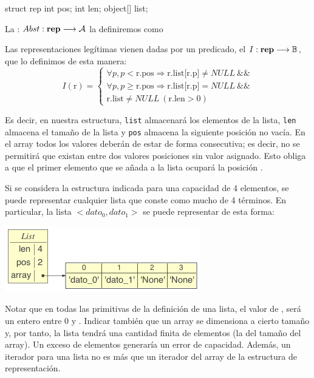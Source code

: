 \hfil \begin{minipage}{.25\textwidth}
\begin{pyverbatim}[][frame=single]
struct rep {
   int pos;
   int len;
   object[] list;
}
\end{pyverbatim}
\end{minipage}


La :
$
Abst: \mbox{\textbf{rep}} \longrightarrow {\cal A}
$
la definiremos como

\centerline{}

Las representaciones legítimas vienen dadas por un predicado, el  
$I: \mbox{\textbf{rep}} \longrightarrow \mathbb{B}$, que lo definimos de esta manera:
$$I( \text{r} ) =
\left\{
\begin{array}{l}
\forall p, p < \text{r.pos} \Rightarrow \text{r.list[r.p]} \not= NULL\ \&\& \\
\forall p, p \geq \text{r.pos} \Rightarrow \text{r.list[r.p]} = NULL \ \&\& \\
\text{r.list} \not= NULL \ (\text{r.len} > 0)
\end{array}
\right.
$$

Es decir, en nuestra estructura, \texttt{list} almacenará los elementos de la lista, \texttt{len} almacena el tamaño de la lista y \texttt{pos} almacena la siguiente posición no vacía. En el array todos los valores deberán de estar de forma consecutiva; es decir, no se permitirá que existan entre dos valores posiciones sin valor asignado. Esto obliga a que el primer elemento que se añada a la lista ocupará la posición .

\begin{ejemplo}
Si se considera la estructura indicada para una capacidad de 4 elementos, se puede representar cualquier lista que conste como mucho de 4 términos. En particular, la lista $<dato_0, dato_1>$ se puede representar de esta forma:

\centerline{\includegraphics[width=.5\textwidth]{input/05-List-fig/ejemListaConArray}}
\end{ejemplo}

Notar que en todas las primitivas de la definición de una lista, el valor de ,  será un entero  entre 0 y . Indicar también  que un array se dimensiona a cierto tamaño y, por tanto, la lista tendrá una cantidad finita de elementos (la del tamaño del array). Un exceso de elementos generaría un error de capacidad. Además, un iterador para una lista no es más que un iterador del array de la estructura de representación.



